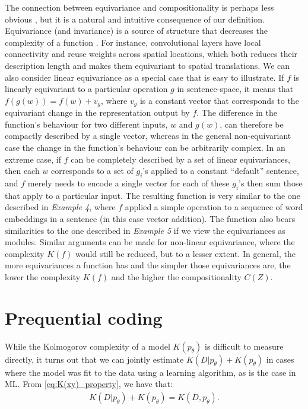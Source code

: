 \documentclass{article} %
\begin{document}
\begin{appendices}
The connection between equivariance and compositionality is perhaps less obvious \citep{gordon2020permutation}, but it is a natural and intuitive consequence of our definition. Equivariance (and invariance) is a source of structure that decreases the complexity of a function \citep{immer2022invariance,wilk2018learning,van2022learning}. For instance, convolutional layers have local connectivity and reuse weights across spatial locations, which both reduces their description length and makes them equivariant to spatial translations. We can also consider linear equivariance as a special case that is easy to illustrate. If $f$ is linearly equivariant to a particular operation $g$ in sentence-space, it means that $f(g(w)) = f(w) + v_g$, where $v_g$ is a constant vector that corresponds to the equivariant change in the representation output by $f$. The difference in the function's behaviour for two different inputs, $w$ and $g(w)$, can therefore be compactly described by a single vector, whereas in the general non-equivariant case the change in the function's behaviour can be arbitrarily complex. In an extreme case, if $f$ can be completely described by a set of linear equivariances, then each $w$ corresponds to a set of $g_i$'s applied to a constant ``default'' sentence, and $f$ merely needs to encode a single vector for each of these $g_i$'s then sum those that apply to a particular input. The resulting function is very similar to the one described in \textit{Example 4}, where $f$ applied a simple operation to a sequence of word embeddings in a sentence (in this case vector addition). The function also bears similarities to the one described in \textit{Example 5} if we view the equivariances as modules. Similar arguments can be made for non-linear equivariance, where the complexity $K(f)$ would still be reduced, but to a lesser extent. In general, the more equivariances a function has and the simpler those equivariances are, the lower the complexity $K(f)$ and the higher the compositionality $C(Z)$.


\section{Prequential coding}
\label{sec:prequential}

While the Kolmogorov complexity of a model $K(p_\theta)$ is difficult to measure directly, it turns out that we can jointly estimate $K(D|p_\theta) + K(p_\theta)$ in cases where the model was fit to the data using a learning algorithm, as is the case in ML. From \cref{eq:K(xy)_property}, we have that:
\begin{align}
    K(D|p_\theta) + K(p_\theta) = K(D, p_\theta) .
\end{align}


\end{appendices}
\end{document}
